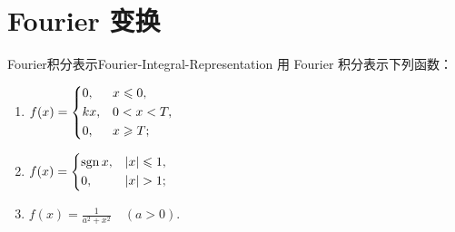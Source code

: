 \section{Fourier 变换}

\begin{problem}{Fourier积分表示}{Fourier-Integral-Representation}
    用 Fourier 积分表示下列函数：
    \begin{enumerate}
        \item $f(x) = \begin{dcases} 0, & x \leqslant 0, \\ kx, & 0 < x < T, \\ 0, & x \geqslant T; \end{dcases}$
        \item $f(x) = \begin{dcases} \operatorname{sgn} x, & |x| \leqslant 1, \\ 0, & |x| > 1; \end{dcases}$
        \item $f(x) = \frac{1}{a^2+x^2} \quad (a > 0)$.
    \end{enumerate}
\end{problem}

